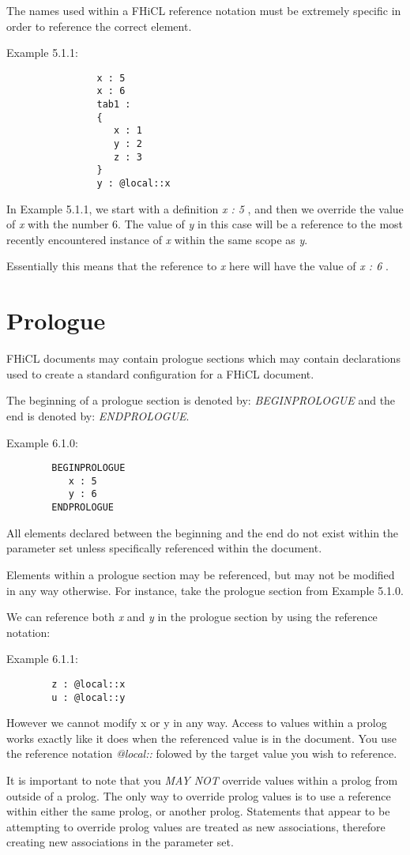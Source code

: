 \documentclass{memarticle}
\begin{document}
        The names used within a FHiCL reference notation must be extremely specific in order to reference the correct element.
        \par
        Example 5.1.1:
        \begin{verbatim}
                x : 5
                x : 6
                tab1 :
                {
                   x : 1
                   y : 2
                   z : 3
                }
                y : @local::x
        \end{verbatim}
        \par
        In Example 5.1.1, we start with a definition \emph{ x : 5 },
        and then we override the value of \emph{x} with the number 6.
        The value of \emph{y} in this case will be a reference to the
        most recently encountered instance of \emph{x} within the same scope
        as \emph{y}.
        \par
        Essentially this means that the reference to \emph{x} here will have the value
        of \emph{ x : 6 }.

\chapter{Prologue}
	FHiCL documents may contain prologue sections which may contain declarations used to create
	a standard configuration for a FHiCL document.
	\par
	The beginning of a prologue section is denoted by:
	\emph{BEGINPROLOGUE}
	and the end is denoted by:
	\emph{ENDPROLOGUE}.
	\par
	Example 6.1.0:
	\begin{verbatim}
		BEGINPROLOGUE
		   x : 5
		   y : 6
		ENDPROLOGUE
	\end{verbatim}
	All elements declared between the beginning and the end 
	do not exist within the parameter set unless specifically
	referenced within the document.
	\par
	Elements within a prologue section may be referenced,
	but may not be modified in any way otherwise.
	For instance, take the prologue section from Example 5.1.0.
	\par
	We can reference both \emph{x} and \emph{y} in the prologue section by using the reference notation:
	\par
	Example 6.1.1:
	\begin{verbatim}
		z : @local::x
		u : @local::y
	\end{verbatim}
	\par
	However we cannot modify x or y in any way.
        Access to values within a prolog works exactly like it does when the referenced value is in the document.
        You use the reference notation \emph{@local::} folowed by the target value you wish to reference.
        \par
        It is important to note that you \emph{MAY NOT} override values within a prolog from outside of a prolog.
        The only way to override prolog values is to use a reference within either the same prolog, or another prolog.
        Statements that appear to be attempting to override prolog values are treated as new associations, therefore creating
        new associations in the parameter set.
\end{document}

